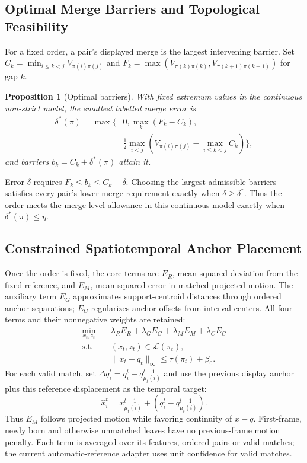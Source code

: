 \documentclass[review]{vgtc}
\newtheorem{proposition}{Proposition}
\begin{document}
\subsection{Optimal Merge Barriers and Topological Feasibility}
For a fixed order, a pair's displayed merge is the largest intervening barrier. Set $C_k=\min_{i\le k<j}V_{\pi(i)\pi(j)}$ and $F_k=\max(V_{\pi(k)\pi(k)},V_{\pi(k+1)\pi(k+1)})$ for gap $k$.
\begin{proposition}[Optimal barriers]\label{prop:barriers}
With fixed extremum values in the continuous non-strict model, the smallest labelled merge error is
\begin{equation}\label{eq:delta}
\begin{split}
 \delta^*(\pi)=\max\bigg\{&0,\max_k(F_k-C_k),\\
 &\frac12\max_{i<j}\left(V_{\pi(i)\pi(j)}-
                         \max_{i\le k<j}C_k\right)\bigg\},
\end{split}
\end{equation}
and barriers $b_k=C_k+\delta^*(\pi)$ attain it.
\end{proposition}
Error $\delta$ requires $F_k\le b_k\le C_k+\delta$. Choosing the largest admissible barriers satisfies every pair's lower merge requirement exactly when $\delta\ge\delta^*$. Thus the order meets the merge-level allowance in this continuous model exactly when $\delta^*(\pi)\le\eta$. 

\subsection{Constrained Spatiotemporal Anchor Placement}
Once the order is fixed, the core terms are $E_R$, mean squared deviation from the fixed reference, and $E_M$, mean squared error in matched projected motion. The auxiliary term $E_G$ approximates support-centroid distances through ordered anchor separations; $E_C$ regularizes anchor offsets from interval centers. All four terms and their nonnegative weights are retained:
\begin{equation}\label{eq:qp}
\begin{aligned}
 \min_{x_t,z_t}\quad&\lambda_R E_R+\lambda_G E_G+\lambda_M E_M+\lambda_C E_C\\
 \mathrm{s.t.}\quad&(x_t,z_t)\in\mathcal{L}(\pi_t),\\
 &\|x_t-q_t\|_\infty\le\tau(\pi_t)+\beta_0.
\end{aligned}
\end{equation}
For each valid match, set $\Delta q_i^t=q_i^t-q_{\mu_t(i)}^{t-1}$ and use the previous display anchor plus this reference displacement as the temporal target:
\begin{equation}\label{eq:temporal_target}
 \hat x_i^t=x_{\mu_t(i)}^{t-1}+(q_i^t-q_{\mu_t(i)}^{t-1}).
\end{equation}
Thus $E_M$ follows projected motion while favoring continuity of $x-q$. First-frame, newly born and otherwise unmatched leaves have no previous-frame motion penalty. Each term is averaged over its features, ordered pairs or valid matches; the current automatic-reference adapter uses unit confidence for valid matches. 
\end{document}

